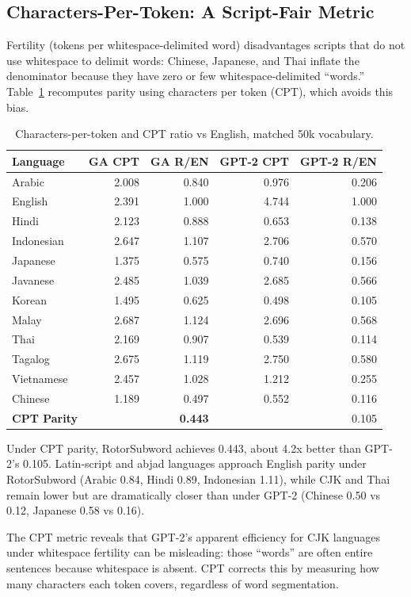 \documentclass[11pt]{article}
\begin{document}
\subsection{Characters-Per-Token: A Script-Fair Metric}

Fertility (tokens per whitespace-delimited word) disadvantages scripts that do not use whitespace to delimit words: Chinese, Japanese, and Thai inflate the denominator because they have zero or few whitespace-delimited ``words.'' Table~\ref{tab:cpt} recomputes parity using characters per token (CPT), which avoids this bias.

\begin{table}[htbp]
\centering
\caption{Characters-per-token and CPT ratio vs English, matched 50k vocabulary.}
\label{tab:cpt}
\begin{tabular}{lrrrr}
\toprule
Language & GA CPT & GA R/EN & GPT-2 CPT & GPT-2 R/EN \\
\midrule
Arabic & 2.008 & 0.840 & 0.976 & 0.206 \\
English & 2.391 & 1.000 & 4.744 & 1.000 \\
Hindi & 2.123 & 0.888 & 0.653 & 0.138 \\
Indonesian & 2.647 & 1.107 & 2.706 & 0.570 \\
Japanese & 1.375 & 0.575 & 0.740 & 0.156 \\
Javanese & 2.485 & 1.039 & 2.685 & 0.566 \\
Korean & 1.495 & 0.625 & 0.498 & 0.105 \\
Malay & 2.687 & 1.124 & 2.696 & 0.568 \\
Thai & 2.169 & 0.907 & 0.539 & 0.114 \\
Tagalog & 2.675 & 1.119 & 2.750 & 0.580 \\
Vietnamese & 2.457 & 1.028 & 1.212 & 0.255 \\
Chinese & 1.189 & 0.497 & 0.552 & 0.116 \\
\textbf{CPT Parity} & & \textbf{0.443} & & 0.105 \\
\bottomrule
\end{tabular}
\end{table}

Under CPT parity, RotorSubword achieves 0.443, about 4.2x better than GPT-2's 0.105. Latin-script and abjad languages approach English parity under RotorSubword (Arabic 0.84, Hindi 0.89, Indonesian 1.11), while CJK and Thai remain lower but are dramatically closer than under GPT-2 (Chinese 0.50 vs 0.12, Japanese 0.58 vs 0.16).

The CPT metric reveals that GPT-2's apparent efficiency for CJK languages under whitespace fertility can be misleading: those ``words'' are often entire sentences because whitespace is absent. CPT corrects this by measuring how many characters each token covers, regardless of word segmentation.
\end{document}
